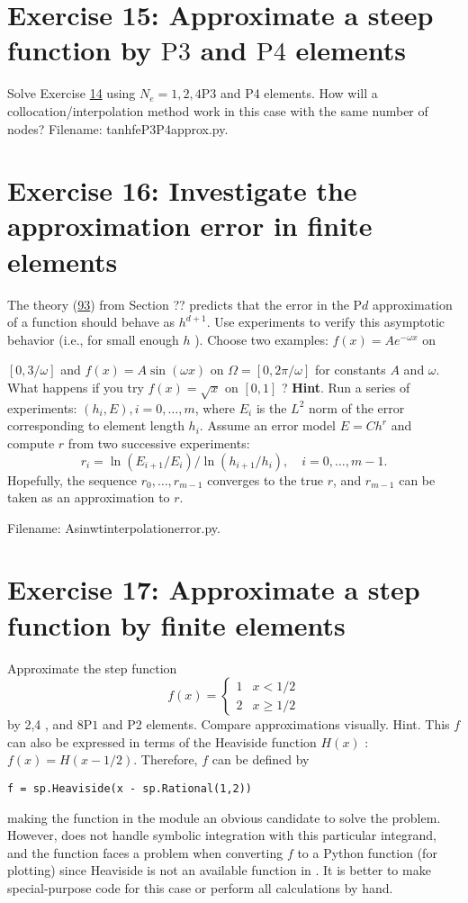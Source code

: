 \documentclass[../main.tex]{subfiles}
\begin{document}
	\section*{Exercise 15: Approximate a steep function by $\mathrm{P} 3$ and $\mathrm{P} 4$ elements}
	\label{sec:sec_10_15}
	\noindent Solve Exercise \hyperref[sec:sec_10_14]{14} using $N_{e}=1,2,4 \mathrm{P} 3$ and P4 elements. How will a collocation/interpolation method work in this case with the same number of nodes? Filename: tanh\textunderscore fe\textunderscore P3P4\textunderscore approx.py.
	\bigbreak
	\section*{Exercise 16: Investigate the approximation error in finite elements}
	\label{sec:sec_10_16}
	\noindent The theory (\hyperref[eqa93]{93}) from Section ?? predicts that the error in the $\mathrm{P} d$ approximation of a function should behave as $h^{d+1}$. Use experiments to verify this asymptotic behavior (i.e., for small enough $h$ ). Choose two examples: $f(x)=A e^{-\omega x}$ on
	
	$[0,3 / \omega]$ and $f(x)=A \sin (\omega x)$ on $\Omega=[0,2 \pi / \omega]$ for constants $A$ and $\omega$. What happens if you try $f(x)=\sqrt{x}$ on $[0,1]$ ?
	\bigbreak
	\noindent \textbf{Hint}. Run a series of experiments: $\left(h_{i}, E\right), i=0, \ldots, m$, where $E_{i}$ is the $L^{2}$ norm of the error corresponding to element length $h_{i}$. Assume an error model $E=C h^{r}$ and compute $r$ from two successive experiments:
	$$
	r_{i}=\ln \left(E_{i+1} / E_{i}\right) / \ln \left(h_{i+1} / h_{i}\right), \quad i=0, \ldots, m-1 .
	$$
	Hopefully, the sequence $r_{0}, \ldots, r_{m-1}$ converges to the true $r$, and $r_{m-1}$ can be taken as an approximation to $r$.
	
	Filename: Asinwt\textunderscore interpolation\textunderscore error.py.
	\bigbreak
	\section*{Exercise 17: Approximate a step function by finite elements}
	\label{sec:sec_10_17}
	\noindent  Approximate the step function
	$$
	f(x)= \begin{cases}1 & x<1 / 2 \\ 2 & x \geq 1 / 2\end{cases}
	$$
	by 2,4 , and $8 \mathrm{P} 1$ and P2 elements. Compare approximations visually.
	Hint. This $f$ can also be expressed in terms of the Heaviside function $H(x)$ : $f(x)=H(x-1 / 2)$. Therefore, $f$ can be defined by
	\begin{lstlisting}[numbers=none]
		f = sp.Heaviside(x - sp.Rational(1,2))	
	\end{lstlisting}
	making the   function in the  module an obvious candidate to solve the problem. However,   does not handle symbolic integration with this particular integrand, and the   function faces a problem when converting $f$ to a Python function (for plotting) since Heaviside is not an available function in . It is better to make special-purpose code for this case or perform all calculations by hand.
	
\end{document}
